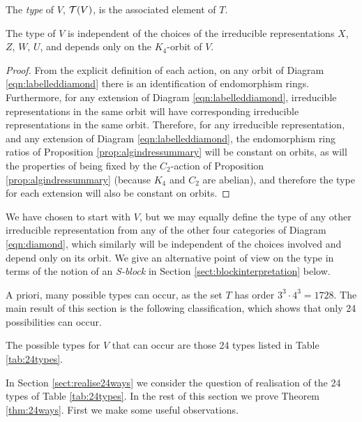 \begin{defn}
The \emph{type} of $V$, ${\mathcal T}(V)$, is the associated element of $T$.
\end{defn}

\begin{lemma}\label{lem:typeindependence}
    The type of $V$ is independent of the choices of the irreducible representations $X$, $Z$, $W$, $U$, and depends only on the $K_4$-orbit of $V$.
\end{lemma}

\begin{proof}
    From the explicit definition of each action, on any orbit of Diagram \eqref{eqn:labelleddiamond} there is an identification of endomorphism rings. Furthermore, for any extension of Diagram \eqref{eqn:labelleddiamond}, irreducible representations in the same orbit will have corresponding irreducible representations in the same orbit. Therefore, for any irreducible representation, and any extension of Diagram \eqref{eqn:labelleddiamond}, the endomorphism ring ratios of Proposition \ref{prop:algindressummary} will be constant on orbits, as will the properties of being fixed by the $C_2$-action of Proposition \ref{prop:algindressummary} (because $K_4$ and $C_2$ are abelian), and therefore the type for each extension will also be constant on orbits.    
\end{proof}

\begin{remark}
    We have chosen to start with $V$, but we may equally define the type of any other irreducible representation from any of the other four categories of Diagram \eqref{eqn:diamond}, which similarly will be independent of the choices involved and depend only on its orbit. We give an alternative point of view on the type in terms of the notion of an \emph{S-block} in Section \ref{sect:blockinterpretation} below.
\end{remark}

A priori, many possible types can occur, as the set $T$ has order $3^3 \cdot 4^3 = 1728$. The main result of this section is the following classification, which shows that only 24 possibilities can occur.

\begin{thm}\label{thm:24ways}
The possible types for $V$ that can occur are those 24 types listed in Table \ref{tab:24types}.
\end{thm}

In Section \ref{sect:realise24ways} we consider the question of realisation of the 24 types of Table \ref{tab:24types}. In the rest of this section we prove Theorem \ref{thm:24ways}. First we make some useful observations.

